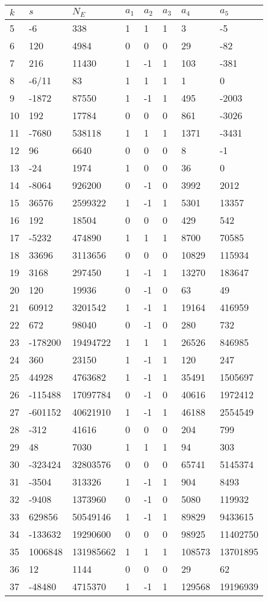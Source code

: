 \documentclass{amsart}
\begin{document}
\begin{longtable}{|l|l|l|lllll|}
\hline
$k$ & $s$ & $N_E$ & $a_1$ & $a_2$ & $a_3$ & $a_4$ & $a_5$\\
\hline
5&-6&338&1&1&1&3&-5\\
6&120&4984&0&0&0&29&-82\\
7&216&11430&1&-1&1&103&-381\\
8&-6/11&83&1&1&1&1&0\\
9&-1872&87550&1&-1&1&495&-2003\\
10&192&17784&0&0&0&861&-3026\\
11&-7680&538118&1&1&1&1371&-3431\\
12&96&6640&0&0&0&8&-1\\
13&-24&1974&1&0&0&36&0\\
14&-8064&926200&0&-1&0&3992&2012\\
15&36576&2599322&1&-1&1&5301&13357\\
16&192&18504&0&0&0&429&542\\
17&-5232&474890&1&1&1&8700&70585\\
18&33696&3113656&0&0&0&10829&115934\\
19&3168&297450&1&-1&1&13270&183647\\
20&120&19936&0&-1&0&63&49\\
21&60912&3201542&1&-1&1&19164&416959\\
22&672&98040&0&-1&0&280&732\\
23&-178200&19494722&1&1&1&26526&846985\\
24&360&23150&1&-1&1&120&247\\
25&44928&4763682&1&-1&1&35491&1505697\\
26&-115488&17097784&0&-1&0&40616&1972412\\
27&-601152&40621910&1&-1&1&46188&2554549\\
28&-312&41616&0&0&0&204&799\\
29&48&7030&1&1&1&94&303\\
30&-323424&32803576&0&0&0&65741&5145374\\
31&-3504&313326&1&-1&1&904&8493\\
32&-9408&1373960&0&-1&0&5080&119932\\
33&629856&50549146&1&-1&1&89829&9433615\\
34&-133632&19290600&0&0&0&98925&11402750\\
35&1006848&131985662&1&1&1&108573&13701895\\
36&12&1144&0&0&0&29&62\\
37&-48480&4715370&1&-1&1&129568&19196939\\

\end{longtable}
\end{document}

